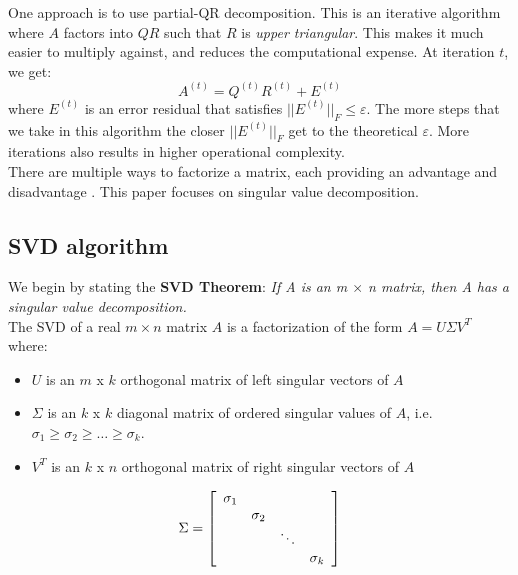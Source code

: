 \documentclass{article}
\begin{document}
One approach is to use partial-QR decomposition. This is an iterative algorithm where $A$ factors into $QR$ such that $R$ is \textit{upper triangular}. This makes it much easier to multiply against, and reduces the computational expense. At iteration $t$, we get:
$$A^{(t)} = Q^{(t)}R^{(t)} + E^{(t)}$$
where $E^{(t)}$ is an error residual that satisfies $||E^{(t)}||_{F}\leq \varepsilon$. The more steps that we take in this algorithm the closer $||E^{(t)}||_{F}$ get to the theoretical $\varepsilon$. More iterations also results in higher operational complexity. 
\\

There are multiple ways to factorize a matrix, each providing an advantage and disadvantage \cite{factorize}. This paper focuses on singular value decomposition. 

\subsection{SVD algorithm}

We begin by stating the \textbf{SVD Theorem}: \textit{If A is an m $\times$ n matrix, then A has a singular value decomposition.}
\\

The SVD of a real $m \times n$ matrix $A$ is a factorization of the form $A = U \Sigma V^{T}$ where:

\begin{itemize}
\item $U$ is an $m$ x $k$ orthogonal matrix of left singular vectors of $A$
\item $\Sigma$ is an $k$ x $k$ diagonal matrix of ordered singular values of $A$, i.e. $\sigma_{1} \geq \sigma_{2} \geq \hdots \geq \sigma_{k}$. 
\item $V^{T}$ is an $k$ x $n$ orthogonal matrix of right singular vectors of $A$
\end{itemize}

$$\Sigma = \left[ {\begin{array}{*{10}ccc}
    \sigma_{1} & & & \\
    & \sigma_{2} & & \\
    & & \ddots & \\
    & & & \sigma_{k} 
\end{array} } \right]$$
\\
\end{document}
